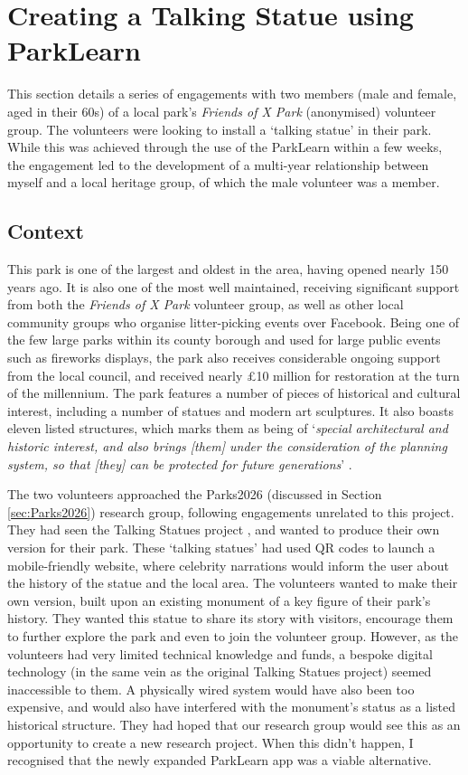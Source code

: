 \section{Creating a Talking Statue using ParkLearn}
\label{sec:TalkingStatue}

This section details a series of engagements with two members (male and female, aged in their 60s) of a local park's \textit{Friends of X Park} (anonymised) volunteer group. The volunteers were looking to install a `talking statue' in their park. While this was achieved through the use of the ParkLearn within a few weeks, the engagement led to the development of a multi-year relationship between myself and a local heritage group, of which the male volunteer was a member. 

\subsection{Context}
This park is one of the largest and oldest in the area, having opened nearly 150 years ago. It is also one of the most well maintained, receiving significant support from both the \textit{Friends of X Park} volunteer group, as well as other local community groups who organise litter-picking events over Facebook. Being one of the few large parks within its county borough and used for large public events such as fireworks displays, the park also receives considerable ongoing support from the local council, and received nearly £10 million for restoration at the turn of the millennium. The park features a number of pieces of historical and cultural interest, including a number of statues and modern art sculptures. It also boasts eleven listed structures, which marks them as being of `\textit{special architectural and historic interest, and also brings [them] under the consideration of the planning system, so that [they] can be protected for future generations}' \citep{HistoricEngland2020}. 

The two volunteers approached the Parks2026 (discussed in Section \ref{sec:Parks2026}) research group, following engagements unrelated to this project. They had seen the Talking Statues project \citep{Sing2017}, and wanted to produce their own version for their park. These `talking statues' had used QR codes to launch a mobile-friendly website, where celebrity narrations would inform the user about the history of the statue and the local area. The volunteers wanted to make their own version, built upon an existing monument of a key figure of their park's history. They wanted this statue to share its story with visitors, encourage them to further explore the park and even to join the volunteer group. However, as the volunteers had very limited technical knowledge and funds, a bespoke digital technology (in the same vein as the original Talking Statues project) seemed inaccessible to them. A physically wired system would have also been too expensive, and would also have interfered with the monument’s status as a listed historical structure. They had hoped that our research group would see this as an opportunity to create a new research project. When this didn't happen, I recognised that the newly expanded ParkLearn app was a viable alternative.

